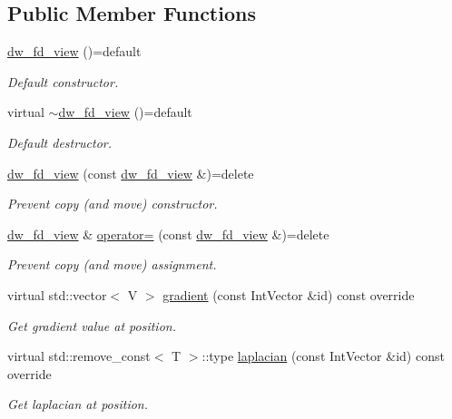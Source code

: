 \subsection*{Public Member Functions}
\begin{DoxyCompactItemize}
\item 
\hyperlink{classUintah_1_1PhaseField_1_1detail_1_1dw__fd__view_3_01ScalarField_3_01T_01_4_00_01STN_00_01VAR_01_4_a1295ecab76eb1e5d9298f6dfb422e50c}{dw\+\_\+fd\+\_\+view} ()=default
\begin{DoxyCompactList}\small\item\em Default constructor. \end{DoxyCompactList}\item 
virtual \hyperlink{classUintah_1_1PhaseField_1_1detail_1_1dw__fd__view_3_01ScalarField_3_01T_01_4_00_01STN_00_01VAR_01_4_a60f52e459d40794dd546c478b62263c3}{$\sim$dw\+\_\+fd\+\_\+view} ()=default
\begin{DoxyCompactList}\small\item\em Default destructor. \end{DoxyCompactList}\item 
\hyperlink{classUintah_1_1PhaseField_1_1detail_1_1dw__fd__view_3_01ScalarField_3_01T_01_4_00_01STN_00_01VAR_01_4_a99fc15fbf127ebbf1634b16ffd7cdc61}{dw\+\_\+fd\+\_\+view} (const \hyperlink{classUintah_1_1PhaseField_1_1detail_1_1dw__fd__view}{dw\+\_\+fd\+\_\+view} \&)=delete
\begin{DoxyCompactList}\small\item\em Prevent copy (and move) constructor. \end{DoxyCompactList}\item 
\hyperlink{classUintah_1_1PhaseField_1_1detail_1_1dw__fd__view}{dw\+\_\+fd\+\_\+view} \& \hyperlink{classUintah_1_1PhaseField_1_1detail_1_1dw__fd__view_3_01ScalarField_3_01T_01_4_00_01STN_00_01VAR_01_4_a34c77876a09c7a3378e63198c5d584b9}{operator=} (const \hyperlink{classUintah_1_1PhaseField_1_1detail_1_1dw__fd__view}{dw\+\_\+fd\+\_\+view} \&)=delete
\begin{DoxyCompactList}\small\item\em Prevent copy (and move) assignment. \end{DoxyCompactList}\item 
virtual std\+::vector$<$ V $>$ \hyperlink{classUintah_1_1PhaseField_1_1detail_1_1dw__fd__view_3_01ScalarField_3_01T_01_4_00_01STN_00_01VAR_01_4_a53bba74114c4e41819e3c3e8128477be}{gradient} (const Int\+Vector \&id) const override
\begin{DoxyCompactList}\small\item\em Get gradient value at position. \end{DoxyCompactList}\item 
virtual std\+::remove\+\_\+const$<$ T $>$\+::type \hyperlink{classUintah_1_1PhaseField_1_1detail_1_1dw__fd__view_3_01ScalarField_3_01T_01_4_00_01STN_00_01VAR_01_4_a8a1d1b1618801478fc2af6b545245c7b}{laplacian} (const Int\+Vector \&id) const override
\begin{DoxyCompactList}\small\item\em Get laplacian at position. \end{DoxyCompactList}\end{DoxyCompactItemize}
